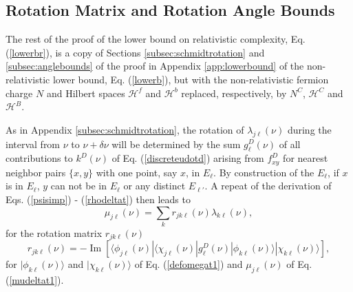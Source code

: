 \documentclass[12pt,amsmath,amssymb,onecolumn]{revtex4-2}
\begin{document}
\subsection{\label{subsec:rest} Rotation Matrix and Rotation Angle Bounds}

The rest of the proof of the lower bound
on relativistic complexity, Eq. (\ref{lowerbr}),
is a copy of
Sections \ref{subsec:schmidtrotation} and \ref{subsec:anglebounds}
of the proof in Appendix \ref{app:lowerbound}
of the non-relativistic lower bound, Eq. (\ref{lowerb}), 
but with the non-relativistic fermion charge $N$ and
Hilbert spaces $\mathcal{H}^f$ and $\mathcal{H}^b$ replaced,
respectively, by $N^C$, $\mathcal{H}^C$ and $\mathcal{H}^B$.

As in Appendix \ref{subsec:schmidtrotation}, the rotation of
$\lambda_{j \ell}(\nu)$ during the interval from $\nu$ to $\nu + \delta \nu$
will be determined by the sum $g^D_{\ell}(\nu)$ of all contributions to $k^D(\nu)$
of Eq. (\ref{discreteudotd})
arising from $f^D_{xy}$ for nearest neighbor pairs $\{x,y\}$ with
one point, say $x$, in $E_\ell$. By construction of
the $E_\ell$, if $x$ is in $E_\ell$, $y$ can not be
in $E_\ell$ or any distinct $E_{\ell'}$.
A repeat of the derivation of Eqs. (\ref{psisimp}) - (\ref{rhodeltat}) 
then leads to
\begin{equation}
\label{ufromperturb1}
\mu_{j\ell}(\nu) = \sum_k r_{jk\ell}(\nu) \lambda_{k\ell}(\nu), 
\end{equation}
for the rotation matrix $r_{jk\ell}(\nu)$
\begin{equation}
\label{rijp1}
r_{jk\ell}(\nu) = 
 -\operatorname{Im}[  \langle \phi_{j\ell}(\nu)| \langle \chi_{j\ell}(\nu)| 
g^D_{\ell}(\nu)|\phi_{k\ell}(\nu) \rangle |\chi_{k\ell}(\nu) \rangle ],
\end{equation}
for $|\phi_{k\ell}(\nu) \rangle $ and $|\chi_{k\ell}(\nu) \rangle $ of Eq. (\ref{defomegat1})
and $\mu_{j\ell}(\nu)$ of Eq. (\ref{mudeltat1}).
\end{document}
